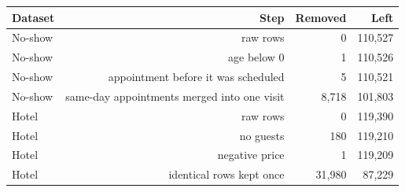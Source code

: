 \begin{tabular}{lrrr}
\toprule
Dataset & Step & Removed & Left \\
\midrule
No-show & raw rows & 0 & 110,527 \\
No-show & age below 0 & 1 & 110,526 \\
No-show & appointment before it was scheduled & 5 & 110,521 \\
No-show & same-day appointments merged into one visit & 8,718 & 101,803 \\
Hotel & raw rows & 0 & 119,390 \\
Hotel & no guests & 180 & 119,210 \\
Hotel & negative price & 1 & 119,209 \\
Hotel & identical rows kept once & 31,980 & 87,229 \\
\bottomrule
\end{tabular}

